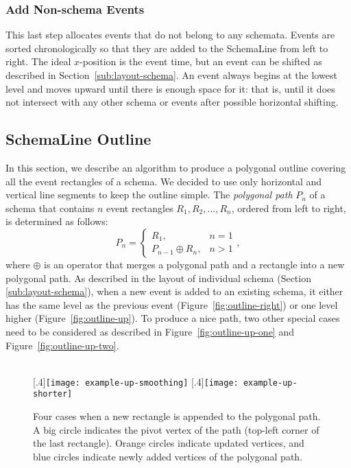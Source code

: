 \subsubsection{Add Non-schema Events}
\label{sub:layout-non-schema}
This last step allocates events that do not belong to any schemata. Events are sorted chronologically so that they are added to the SchemaLine from left to right. The ideal $x$-position is the event time, but an event can be shifted as described in Section~\ref{sub:layout-schema}. An event always begins at the lowest level and moves upward until there is enough space for it: that is, until it does not intersect with any other schema or events after possible horizontal shifting. 

\subsection{SchemaLine Outline}
\label{sub:schema-outline}
In this section, we describe an algorithm to produce a polygonal outline covering all the event rectangles of a schema. We decided to use only horizontal and vertical line segments to keep the outline simple. The \emph{polygonal path} $P_n$ of a schema that contains $n$ event rectangles $R_1, R_2, ..., R_n$, ordered from left to right, is determined as follows:
\[
P_n=
\begin{cases}
R_1, & n=1 \\
P_{n-1} \oplus R_n, & n > 1
\end{cases},
\]
where $\oplus$ is an operator that merges a polygonal path and a rectangle into a new polygonal path. As described in the layout of individual schema (Section \ref{sub:layout-schema}), when a new event is added to an existing schema, it either has the same level as the previous event (Figure~\ref{fig:outline-right}) or one level higher (Figure~\ref{fig:outline-up}). To produce a nice path, two other special cases need to be considered as described in Figure~\ref{fig:outline-up-one} and Figure~\ref{fig:outline-up-two}.

\begin{figure}[ht]
	\centering
	\hfill
	\\
	[.4\linewidth]{\texttt{[image: example-up-smoothing]}}
	\hfill
	[.4\linewidth]{\texttt{[image: example-up-shorter]}}
	\caption{Four cases when a new rectangle  is appended to the polygonal path. A big circle indicates the pivot vertex of the path (top-left corner of the last rectangle). Orange circles indicate updated vertices, and blue circles indicate newly added vertices of the polygonal path.}
	\label{fig:outline}
\end{figure}

